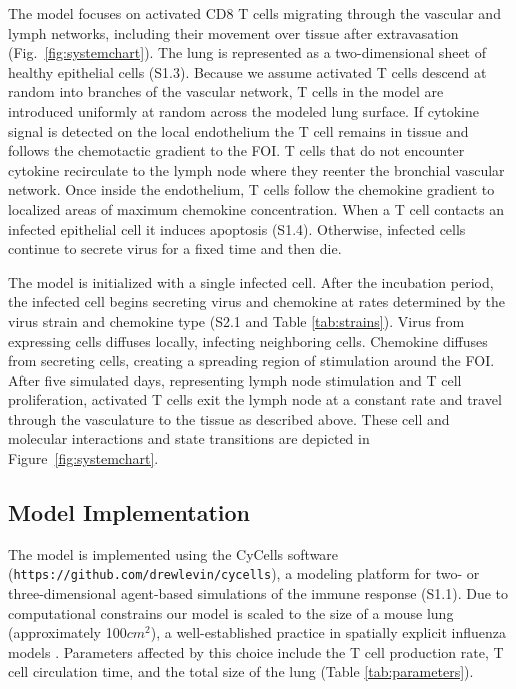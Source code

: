 \documentclass[10pt]{article}
\begin{document}
The model focuses on activated CD8 T cells migrating through the vascular and lymph networks, including their movement over tissue after extravasation (Fig.~\ref{fig:systemchart}).  The lung is represented as a two-dimensional sheet of healthy epithelial cells (S1.3).   Because we assume activated T cells descend at random into branches of the vascular network, T cells in the model are introduced uniformly at random across the modeled lung surface.  If cytokine signal is detected on the local endothelium the T cell remains in tissue and follows the chemotactic gradient to the FOI.  T cells that do not encounter cytokine recirculate to the lymph node where they reenter the bronchial vascular network.  Once inside the endothelium, T cells follow the chemokine gradient to localized areas of maximum chemokine concentration.  When a T cell contacts an infected epithelial cell it induces apoptosis (S1.4).  Otherwise, infected cells continue to secrete virus for a fixed time and then die.

The model is initialized with a single infected cell.  After the incubation period, the infected cell begins secreting virus and chemokine at rates determined by the virus strain and chemokine type (S2.1 and Table \ref{tab:strains}).  Virus from expressing cells diffuses locally, infecting neighboring cells. Chemokine diffuses from secreting cells, creating a spreading region of stimulation around the FOI. After five simulated days, representing lymph node stimulation and T cell proliferation, activated T cells exit the lymph node at a constant rate and travel through the vasculature to the tissue as described above.  These cell and molecular interactions and state transitions are depicted in Figure~\ref{fig:systemchart}.

\subsection*{Model Implementation}

The model is implemented using the CyCells software \cite{Warrender2006} (\texttt{https://github.com/drewlevin/cycells}), a modeling platform for two- or three-dimensional agent-based simulations of the immune response (S1.1).  Due to computational constrains our model is scaled to the size of a mouse lung (approximately 100$cm^2$), a well-established practice in spatially explicit influenza models \cite{Miller2003, Allan2006, Ingulli2009}.  Parameters affected by this choice include the T cell production rate, T cell circulation time, and the total size of the lung (Table \ref{tab:parameters}).
\end{document}
